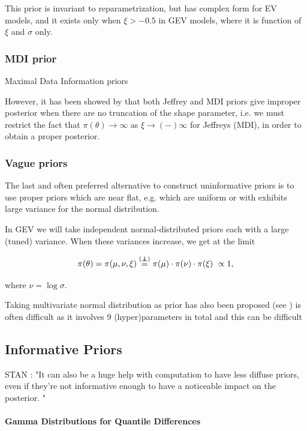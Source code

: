 \documentclass[11pt,a4paper,openany ]{book}
\newcommand\independent{\protect\mathpalette{\protect\independenT}{\perp}}
\def\independenT#1#2{\mathrel{\rlap{$#1#2$}\mkern2mu{#1#2}}}
\begin{document}
This prior is invariant to reparametrization, but has complex form for EV models, and it exists only when $\xi>-0.5$ in GEV models, where it is function of $\xi$ and $\sigma$ only.


\subsubsection*{MDI prior}
Maximal Data Information priors


However, it has been showed by \cite{northrop_posterior_2016} that 
both Jeffrey and MDI priors give improper posterior when there are no truncation of the shape parameter, i.e. we must restrict the fact that $\pi(\theta)\rightarrow\infty$ as $\xi\rightarrow(-)\infty$ for Jeffreys (MDI), in order to obtain a proper posterior.

\subsubsection*{Vague priors}
The last and often preferred alternative to construct uninformative priors is to use proper priors which are near flat, e.g. which are uniform or with exhibits large variance for the normal distribution.

In GEV we will take independent normal-distributed priors each with a large (tuned) variance. When these variances increase, we get at the limit

\begin{equation}
\pi(\theta)=\pi(\mu,\nu,\xi)\stackrel{(\independent)}{=}\pi(\mu)\cdot\pi(\nu)\cdot\pi(\xi)\ \propto 1,
\end{equation}

where $\nu= \log\sigma$.

Taking multivariate normal distribution as prior has also been proposed (see ) is often difficult as it involves 9 (hyper)parameters in total and this can be difficult 


\subsection{Informative Priors}

STAN : "It can
also be a huge help with computation to have less diffuse priors, even
if they're not informative enough to have a noticeable impact on the posterior. "

\paragraph{Gamma Distributions for Quantile Differences}
\end{document}
